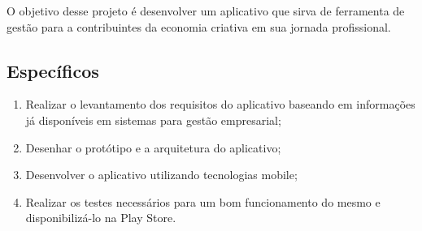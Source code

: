 O objetivo desse projeto é desenvolver um aplicativo que sirva de ferramenta de gestão para a contribuintes da economia criativa em sua jornada profissional.

\subsection{Específicos}\label{subsec:especificos}

\begin{enumerate}
    \item Realizar o levantamento dos requisitos do aplicativo baseando em informações já disponíveis em sistemas para gestão empresarial;
    \item Desenhar o protótipo e a arquitetura do aplicativo;
    \item Desenvolver o aplicativo utilizando tecnologias mobile;
    \item Realizar os testes necessários para um bom funcionamento do mesmo e disponibilizá-lo na Play Store.
\end{enumerate}